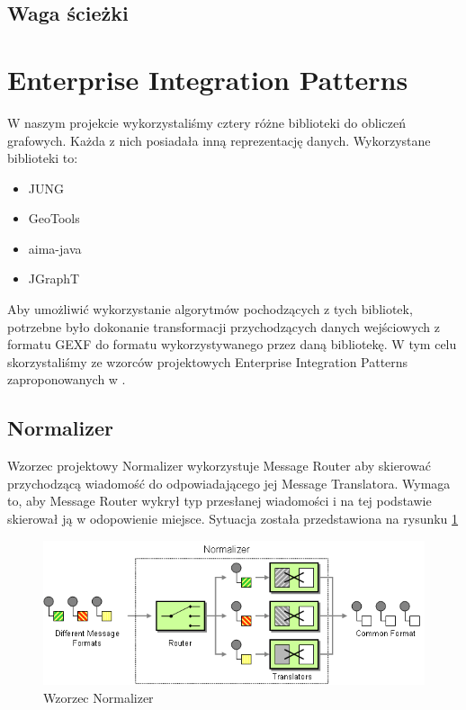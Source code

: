 \subsection{Waga ścieżki}

\section{Enterprise Integration Patterns}
W naszym projekcie wykorzystaliśmy cztery różne biblioteki do obliczeń grafowych. 
Każda z nich posiadała inną reprezentację danych. Wykorzystane biblioteki to:

\begin{itemize}
 \item JUNG
 \item GeoTools
 \item aima-java
 \item JGraphT
\end{itemize}

Aby umożliwić wykorzystanie algorytmów pochodzących z tych bibliotek, potrzebne było dokonanie transformacji przychodzących danych wejściowych z
formatu GEXF do formatu wykorzystywanego przez daną bibliotekę.
W tym celu skorzystaliśmy ze wzorców projektowych Enterprise Integration Patterns zaproponowanych w \cite{hohpe2004enterprise}.

\subsection{Normalizer}
Wzorzec projektowy Normalizer wykorzystuje Message Router aby skierować przychodzącą wiadomość do odpowiadającego jej Message Translatora.
Wymaga to, aby Message Router wykrył typ przesłanej wiadomości i na tej podstawie skierował ją w odopowienie miejsce.
Sytuacja została przedstawiona na rysunku \ref{fig:normalizer}

\begin{figure}[!h]
 \centering
 \includegraphics[width=1.0\textwidth]{eip/Normalizer}
 \caption{Wzorzec Normalizer}
 \label{fig:normalizer}
\end{figure}

